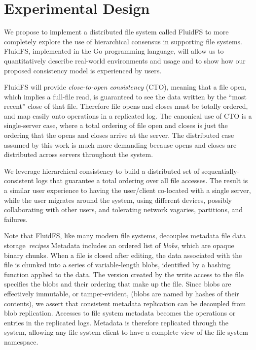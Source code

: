 \documentclass[sigconf]{acmart}
\begin{document}
\section{Experimental Design}

We propose to implement a distributed file system called FluidFS to more completely explore
the use of hierarchical consensus in supporting file systems.
FluidFS, implemented in the Go programming language, will allow us to quantitatively
describe real-world environments and usage and to show how our proposed consistency
model is experienced by users.

FluidFS will provide \emph{close-to-open consistency} (CTO), meaning that a file
open, which implies a full-file read, is guaranteed to see the data written by the ``most recent'' close of
that file.
Therefore file opens and closes must be totally ordered, and map
easily onto operations in a replicated log.
The canonical use of CTO is a single-server case, where a total
ordering of file open and closes is just the ordering that the opens
and closes arrive at the server.
The distributed case assumed by this work is much more demanding because
opens and closes are distributed across servers throughout the system.

We leverage hierarchical consistency to build a distributed set of sequentially-consistent logs
that guarantee a total ordering over all file accesses.
The result is a similar user experience to having the user/client co-located with a single
server, while the user migrates around the system, using different devices, possibly
collaborating with other users, and tolerating network vagaries, partitions, and failures.

Note that FluidFS, like many modern file systems,
decouples metadata file
data storage~\emph{recipes}
Metadata includes an ordered list of \emph{blobs}, which are opaque binary chunks.
When a file is closed after editing, the data associated with the file is chunked into a
series of variable-length blobs, identified by a hashing function applied to
the data.
The version created by the write access to the file specifies the blobs and their ordering
that make up the file.
Since blobs are effectively immutable, or tamper-evident, (blobs are named by hashes of
their contents), we assert that consistent metadata replication can be decoupled from blob
replication.
Accesses to file system metadata becomes the operations or entries in the replicated logs.
Metadata is therefore replicated through the system, allowing any file
system client to have a complete view of the file system namespace.
\end{document}
